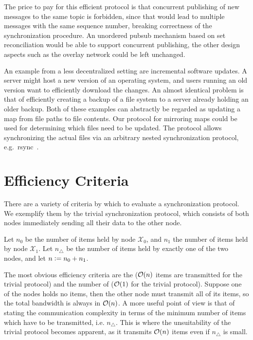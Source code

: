 The price to pay for this efficient protocol is that concurrent publishing of new
messages to the same topic is forbidden, since that would lead to
multiple messages with the same sequence number, breaking correctness
of the synchronization procedure. An unordered pubsub mechanism based on
set reconciliation would be able to support concurrent publishing, the
other design aspects such as the overlay network could be left
unchanged.

An example from a less decentralized setting are incremental software
updates. A server might host a new version of an operating system, and users
running an old version want to efficiently download the changes. An
almost identical problem is that of efficiently creating a backup of a file
system to a server already holding an older backup. Both of these
examples can abstractly be regarded as updating a map from file paths to
file contents. Our protocol for mirroring maps could be used for
determining which files need to be updated. The protocol allows
synchronizing the actual files via an arbitrary nested synchronization
protocol, e.g.~rsync~\cite{tridgell1996rsync}.

\section{Efficiency Criteria}\label{efficiency-criteria}

There are a variety of criteria by which to evaluate a synchronization
protocol. We exemplify them by the trivial synchronization protocol,
which consists of both nodes immediately sending all their data to the
other node.

Let $n_0$ be the number of items held by node $\mathcal{X}_0$, and $n_1$ the number of items
held by node $\mathcal{X}_1$. Let $n_{\triangle}$ be the number of items held by exactly one of the two nodes, and let $n \vcentcolon= n_0 + n_1$.

The most obvious efficiency criteria are the 
($\mathcal{O}(n)$ items are transmitted for the trivial protocol) and the number of
 ($\mathcal{O}(1)$ for the trivial protocol). Suppose one of the nodes holds no items, then the other node must transmit all of its items, so the total bandwidth is always in $\mathcal{O}(n)$. A more useful point of view is that of stating the communication complexity in terms of the minimum number of items which have to be transmitted, i.e. $n_{\triangle}$. This is where the unsuitability of the trivial protocol becomes apparent, as it transmits $\mathcal{O}(n)$ items even if $n_{\triangle}$ is small.


